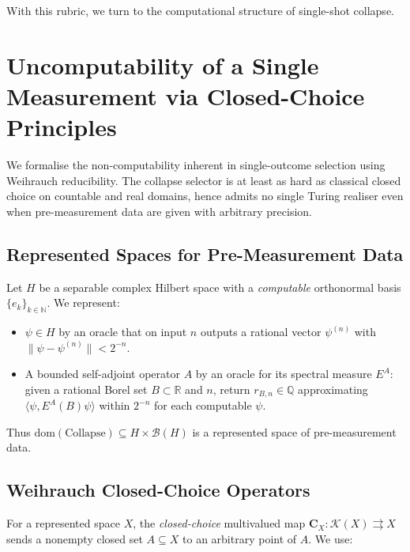 \documentclass[12pt]{article}
\theoremstyle{definition}
\theoremstyle{plain}
\begin{document}
\noindent
With this rubric, we turn to the computational structure of single-shot collapse.

\section{Uncomputability of a Single Measurement via Closed-Choice Principles}
\label{sec:collapse-uncomputable}

We formalise the non-computability inherent in single-outcome selection using Weihrauch reducibility. The collapse selector is at least as hard as classical closed choice on countable and real domains, hence admits no single Turing realiser even when pre-measurement data are given with arbitrary precision.



\subsection{Represented Spaces for Pre-Measurement Data}
\label{subsec:represented-spaces}

Let $H$ be a separable complex Hilbert space with a \emph{computable} orthonormal basis $\{e_k\}_{k\in\mathbb{N}}$. We represent:

\begin{itemize}[itemsep=2pt]
  \item $\psi\in H$ by an oracle that on input $n$ outputs a rational vector $\psi^{(n)}$ with $\|\psi-\psi^{(n)}\|<2^{-n}$.
  \item A bounded self-adjoint operator $A$ by an oracle for its spectral measure $E^A$: given a rational Borel set $B\subset\mathbb{R}$ and $n$, return $r_{B,n}\in\mathbb{Q}$ approximating $\langle \psi,E^A(B)\psi\rangle$ within $2^{-n}$ for each computable $\psi$.
\end{itemize}

\noindent
Thus $\mathrm{dom}(\mathrm{Collapse})\subseteq H\times\mathcal{B}(H)$ is a represented space of pre-measurement data.


\subsection{Weihrauch Closed-Choice Operators}
\label{subsec:weihrauch-choice}

For a represented space $X$, the \emph{closed-choice} multivalued map $\mathbf{C}_X:\mathcal{K}(X)\rightrightarrows X$ sends a nonempty closed set $A\subseteq X$ to an arbitrary point of $A$. We use:
\end{document}
